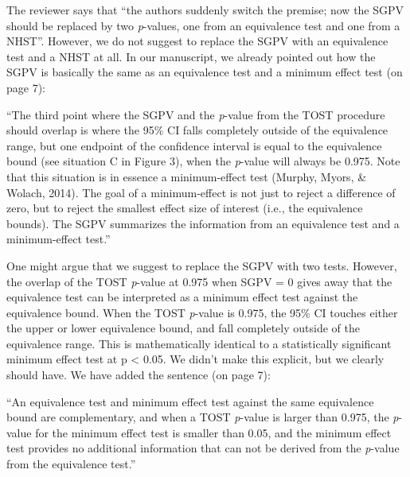 \documentclass[man]{apa6}
\begin{document}
The reviewer says that \enquote{the authors suddenly switch the premise;
now the SGPV should be replaced by two \emph{p}-values, one from an
equivalence test and one from a NHST}. However, we do not suggest to
replace the SGPV with an equivalence test and a NHST at all. In our
manuscript, we already pointed out how the SGPV is basically the same as
an equivalence test and a minimum effect test (on page 7):

\enquote{The third point where the SGPV and the \emph{p}-value from the
TOST procedure should overlap is where the 95\% CI falls completely
outside of the equivalence range, but one endpoint of the confidence
interval is equal to the equivalence bound (see situation C in Figure
3), when the \emph{p}-value will always be 0.975. Note that this
situation is in essence a minimum-effect test (Murphy, Myors, \& Wolach,
2014). The goal of a minimum-effect is not just to reject a difference
of zero, but to reject the smallest effect size of interest (i.e., the
equivalence bounds). The SGPV summarizes the information from an
equivalence test and a minimum-effect test.}

One might argue that we suggest to replace the SGPV with two tests.
However, the overlap of the TOST \emph{p}-value at 0.975 when SGPV = 0
gives away that the equivalence test can be interpreted as a minimum
effect test against the equivalence bound. When the TOST \emph{p}-value
is 0.975, the 95\% CI touches either the upper or lower equivalence
bound, and fall completely outside of the equivalence range. This is
mathematically identical to a statistically significant minimum effect
test at p \textless{} 0.05. We didn't make this explicit, but we clearly
should have. We have added the sentence (on page 7):

\enquote{An equivalence test and minimum effect test against the same
equivalence bound are complementary, and when a TOST \emph{p}-value is
larger than 0.975, the \emph{p}-value for the minimum effect test is
smaller than 0.05, and the minimum effect test provides no additional
information that can not be derived from the \emph{p}-value from the
equivalence test.}
\end{document}
